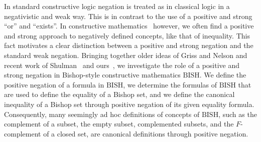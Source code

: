 \documentclass[bsl,meeting]{asl}
\newcommand{\C}[1]{\mathcal{#1}}
\newcommand{\D}[1]{\mathbb{#1}}
\newcommand{\Chu}{\textnormal{\textbf{Chu}}}
\newcommand{\Set}{\mathrm{\mathbf{Set}}}
\newcommand{\BISH}{\mathrm{BISH}}
\newcommand{\NP}{}
\begin{document}
\thispagestyle{empty}










\NP  
{}



In standard constructive logic negation is treated as in classical logic in a negativistic and weak way. 
This is in contrast to the use of a positive and strong ``or'' and ``exists''. 
In constructive mathematics~\cite{BB85}
however, we often find a positive and strong approach to negatively defined concepts, 
like that of inequality.
This fact motivates a clear distinction between a positive and strong negation and the standard weak negation.
Bringing together older ideas of Griss and
Nelson and recent work of Shulman~\cite{Sh21} and ours~\cite{Pe21}, we investigate the role of a positive and 
strong negation in Bishop-style constructive mathematics $\BISH$. We define the positive negation of a formula in
$\BISH$, we determine the formulas of $\BISH$ that are used to define the equality of a Bishop set, and we define the 
canonical inequality of a Bishop set through positive negation of its given equality formula. Consequently, many 
seemingly ad hoc definitions of concepts of $\BISH$, such as the complement of a subset, the empty subset,
complemented subsets, and the $F$-complement of a closed set, are canonical definitions through 
positive negation.   




% 
% 
\end{document}
